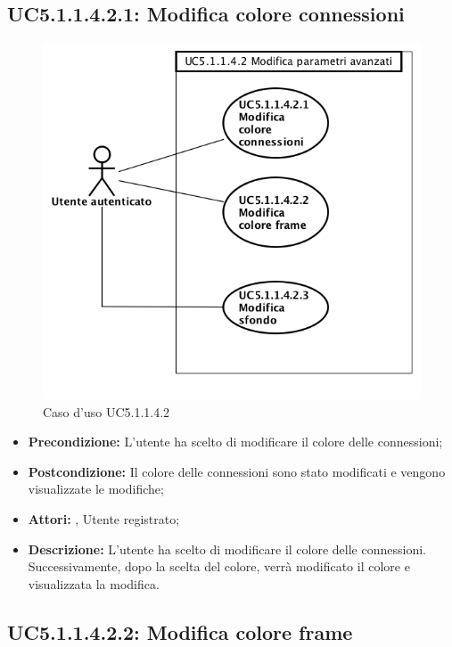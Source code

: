 \subsection{ UC5.1.1.4.2.1: Modifica colore connessioni}

\begin{figure}[h]
	\begin{center}
	\includegraphics[scale=0.4]{diagram/UC5-1-1-4-2.png}
	\caption{Caso d'uso UC5.1.1.4.2}
	\end{center}
\end{figure}
\begin{itemize}
	\item \textbf{Precondizione:} L'utente ha scelto di modificare il colore delle connessioni;
	\item \textbf{Postcondizione:} Il colore delle connessioni sono stato modificati e vengono visualizzate le modifiche;
	\item \textbf{Attori:} , Utente registrato;
	\item \textbf{Descrizione:} L'utente ha scelto di modificare il colore delle connessioni.  Successivamente, dopo la scelta del colore, verrà modificato il colore e visualizzata la modifica.
\end{itemize}
\subsection{ UC5.1.1.4.2.2: Modifica colore frame}

